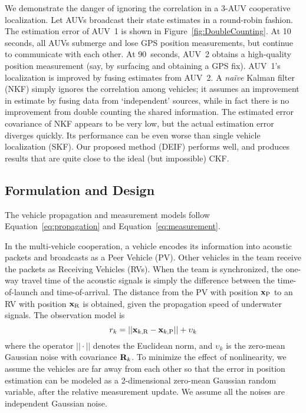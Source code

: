 We demonstrate the danger of ignoring the correlation in a 3-AUV cooperative localization. Let AUVs broadcast their state estimates in a round-robin fashion. The estimation error of AUV~1 is shown in Figure~\ref{fig:DoubleCounting}. At 10 seconds, all AUVs submerge and lose GPS position measurements, but continue to communicate with each other. At 90~seconds, AUV~2 obtains a high-quality position measurement (say, by surfacing and obtaining a GPS fix). AUV~1's localization is improved by fusing estimates from AUV~2. A \textit{na\"ive} Kalman filter (NKF) simply ignores the correlation among vehicles; it assumes an improvement in estimate by fusing data from `independent' sources, while in fact there is no improvement from double counting the shared information. The estimated error covariance of NKF appears to be very low, but the actual estimation error diverges quickly. Its performance can be even worse than single vehicle localization (SKF). Our proposed method (DEIF) performs well, and produces results that are quite close to the ideal (but impossible) CKF.

\subsection{Formulation and Design}

The vehicle propagation and measurement models follow Equation~\eqref{eq:propagation} and Equation~\eqref{eq:measurement}.

In the multi-vehicle cooperation, a vehicle encodes its information into acoustic packets and broadcasts as a Peer Vehicle (PV). Other vehicles in the team receive the packets as Receiving Vehicles (RVs). When the team is synchronized, the one-way travel time of the acoustic signals is simply the difference between the time-of-launch and time-of-arrival. The distance from the PV with position ${\bf x}_\text{P}$ to an RV with position ${\bf x}_\text{R}$ is obtained, given the propagation speed of underwater signals. The observation model is
\begin{equation}
 r_k=||{\bf x}_{k,\text{R}}-{\bf x}_{k,\text{P}}||+\upsilon_k
\end{equation}
where the operator $||\cdot||$ denotes the Euclidean norm, and $\upsilon_k$ is the zero-mean Gaussian noise with covariance ${\bf R}_k$. To minimize the effect of nonlinearity, we assume the vehicles are far away from each other so that the error in position estimation can be modeled as a 2-dimensional zero-mean Gaussian random variable, after the relative measurement update. We assume all the noises are independent Gaussian noise.

